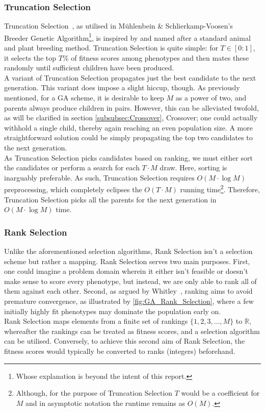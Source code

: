 \subsubsection{Truncation Selection}
Truncation Selection~\cite{Wiki-truncation-selection}, as utilised in Mühlenbein \& Schlierkamp-Voosen's~\cite{Truncation-Selection-Breeder-Algorithm} Breeder Genetic Algorithm\footnote{Whose explanation is beyond the intent of this report.}, is inspired by and named after a standard animal and plant breeding method. Truncation Selection is quite simple: for \(T \in [0:1]\), it selects the top $T\%$ of fitness scores among phenotypes and then mates these randomly until sufficient children have been produced.
\\
A variant of Truncation Selection propagates just the best candidate to the next generation. This variant does impose a slight hiccup, though. As previously mentioned, for a GA scheme, it is desirable to keep $M$ as a power of two, and parents always produce children in pairs. However, this can be alleviated twofold, as will be clarified in section \ref{subsubsec:Crossover}, Crossover; one could actually withhold a single child, thereby again reaching an even population size. A more straightforward solution could be simply propagating the top two candidates to the next generation.
\\
As Truncation Selection picks candidates based on ranking, we must either sort the candidates or perform a search for each \(T \cdot M\) draw. Here, sorting is inarguably preferable. As such, Truncation Selection requires \(O(M \cdot \log M ) \) preprocessing, which completely eclipses the \( O( T \cdot M ) \) running time\footnote{Although, for the purpose of Truncation Selection $T$ would be a coefficient for $M$ and in asymptotic notation the runtime remains as $O(M)$.}. Therefore, Truncation Selection picks all the parents for the next generation in \(O(M \cdot \log M ) \) time.

\subsubsection{Rank Selection}
Unlike the aforementioned selection algorithms, Rank Selection isn't a selection scheme but rather a mapping. Rank Selection serves two main purposes. First, one could imagine a problem domain wherein it either isn't feasible or doesn't make sense to score every phenotype, but instead, we are only able to rank all of them against each other. Second, as argued by Whitley~\cite{Rank-Selection-Usefullness}, ranking aims to avoid premature convergence, as illustrated by \autoref{fig:GA_Rank_Selection}, where a few initially highly fit phenotypes may dominate the population early on.
\\
Rank Selection maps elements from a finite set of rankings $\{1, 2, 3, \hdots, M\}$ to $\mathbb{R}$, whereafter the rankings can be treated as fitness scores, and a selection algorithm can be utilised. Conversely, to achieve this second aim of Rank Selection, the fitness scores would typically be converted to ranks (integers) beforehand.

